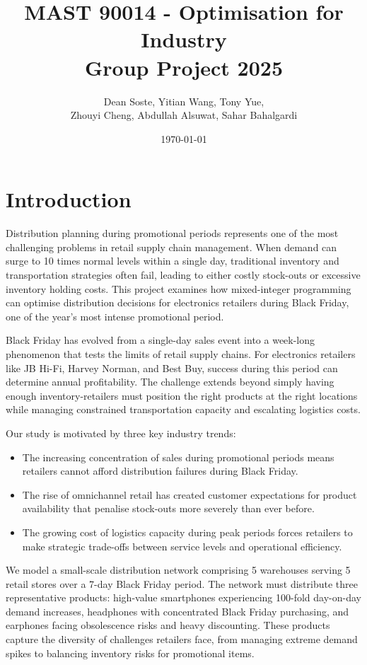 \documentclass[a4paper,12pt]{article}
\title{MAST 90014 - Optimisation for Industry \\ Group Project 2025}
\author{{Dean Soste}, {Yitian Wang}, {Tony Yue}, \\
{Zhouyi Cheng}, {Abdullah Alsuwat}, {Sahar Bahalgardi}
}
\date{\today}
\begin{document}
\maketitle




\section{Introduction}\label{sec:introduction}

Distribution planning during promotional periods represents one of the most challenging problems in retail supply chain management.
When demand can surge to 10 times normal levels within a single day, traditional inventory and transportation strategies often fail, leading to either costly stock-outs or excessive inventory holding costs.
This project examines how mixed-integer programming can optimise distribution decisions for electronics retailers during Black Friday, one of the year's most intense promotional period.

Black Friday has evolved from a single-day sales event into a week-long phenomenon that tests the limits of retail supply chains.
For electronics retailers like JB Hi-Fi, Harvey Norman, and Best Buy, success during this period can determine annual profitability.
The challenge extends beyond simply having enough inventory-retailers must position the right products at the right locations while managing constrained transportation capacity and escalating logistics costs.

Our study is motivated by three key industry trends:
\begin{itemize}
    \item The increasing concentration of sales during promotional periods means retailers cannot afford distribution failures during Black Friday.
    \item The rise of omnichannel retail has created customer expectations for product availability that penalise stock-outs more severely than ever before.
    \item The growing cost of logistics capacity during peak periods forces retailers to make strategic trade-offs between service levels and operational efficiency.
\end{itemize}

We model a small-scale distribution network comprising 5 warehouses serving 5 retail stores over a 7-day Black Friday period.
The network must distribute three representative products: high-value smartphones experiencing 100-fold day-on-day demand increases, headphones with concentrated Black Friday purchasing, and earphones facing obsolescence risks and heavy discounting.
These products capture the diversity of challenges retailers face, from managing extreme demand spikes to balancing inventory risks for promotional items.
\end{document}
